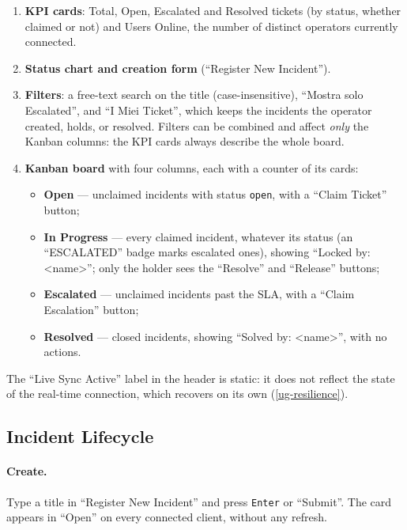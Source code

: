 \documentclass{scrartcl}
\begin{document}
%
\begin{enumerate}
  \item \textbf{KPI cards}: Total, Open, Escalated and Resolved tickets (by status, whether claimed or not) and Users Online, the number of distinct operators currently connected.
  \item \textbf{Status chart and creation form} (``Register New Incident'').
  \item \textbf{Filters}: a free-text search on the title (case-insensitive), ``Mostra solo Escalated'', and ``I Miei Ticket'', which keeps the incidents the operator created, holds, or resolved. Filters can be combined and affect \emph{only} the Kanban columns: the KPI cards always describe the whole board.
  \item \textbf{Kanban board} with four columns, each with a counter of its cards:
  \begin{itemize}
    \item \textbf{Open} --- unclaimed incidents with status \texttt{open}, with a ``Claim Ticket'' button;
    \item \textbf{In Progress} --- every claimed incident, whatever its status (an ``ESCALATED'' badge marks escalated ones), showing ``Locked by: \textless{}name\textgreater{}''; only the holder sees the ``Resolve'' and ``Release'' buttons;
    \item \textbf{Escalated} --- unclaimed incidents past the SLA, with a ``Claim Escalation'' button;
    \item \textbf{Resolved} --- closed incidents, showing ``Solved by: \textless{}name\textgreater{}'', with no actions.
  \end{itemize}
\end{enumerate}
%
The ``Live Sync Active'' label in the header is static: it does not reflect the state of the real-time connection, which recovers on its own (\cref{ug-resilience}).

\subsection{Incident Lifecycle}\label{ug-lifecycle}

\paragraph{Create.} Type a title in ``Register New Incident'' and press \texttt{Enter} or ``Submit''. The card appears in ``Open'' on every connected client, without any refresh.
\end{document}
